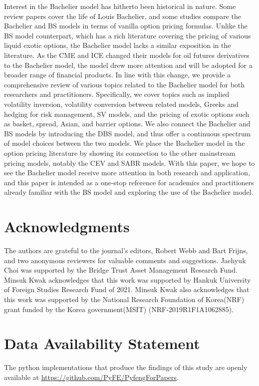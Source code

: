 \documentclass[a4paper,review]{elsarticle}
\begin{document}
Interest in the Bachelier model has hitherto been historical in nature. Some review papers cover the life of Louis Bachelier, and some studies compare the Bachelier and BS models in terms of vanilla option pricing formulas. Unlike the BS model counterpart, which has a rich literature covering the pricing of various liquid exotic options, the Bachelier model lacks a similar exposition in the literature.
As the CME and ICE changed their models for oil futures derivatives to the Bachelier model, the model drew more attention and will be adopted for a broader range of financial products. In line with this change, we provide a comprehensive review of various topics related to the Bachelier model for both researchers and practitioners. Specifically, we cover topics such as implied volatility inversion, volatility conversion between related models, Greeks and hedging for risk management, SV models, and the pricing of exotic options such as basket, spread, Asian, and barrier options. We also connect the Bachelier and BS models by introducing the DBS model, and thus offer a continuous spectrum of model choices between the two models. We place the Bachelier model in the option pricing literature by showing its connection to the other mainstream pricing models, notably the CEV and SABR models. With this paper, we hope to see the Bachelier model receive more attention in both research and application, and this paper is intended as a one-stop reference for academics and practitioners already familiar with the BS model and exploring the use of the Bachelier model.

\section*{Acknowledgments}
The authors are grateful to the journal's editors, Robert Webb and Bart Frijns, and two anonymous reviewers for valuable comments and suggestions.
Jaehyuk Choi was supported by the Bridge Trust Asset Management Research Fund.
Minsuk Kwak acknowledges that this work was supported by Hankuk University of Foreign Studies Research Fund of 2021. Minsuk Kwak also acknowledges that this work was supported by the National Research Foundation of Korea(NRF) grant funded by the Korea government(MSIT) (NRF-2019R1F1A1062885).

\section*{Data Availability Statement} \noindent
The python implementations that produce the findings of this study are openly available at \url{https://github.com/PyFE/PyfengForPapers}.
\end{document}
